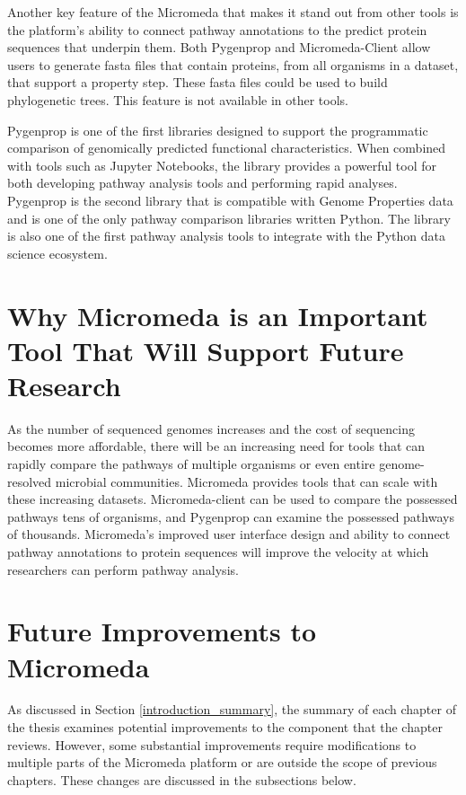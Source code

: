 Another key feature of the Micromeda that makes it stand out from other 
tools is the platform's ability to connect pathway annotations to the predict protein 
sequences that underpin them. Both Pygenprop and Micromeda-Client allow users to 
generate \gls{fasta} files that contain proteins, from all organisms in a dataset, 
that support a property step. These \gls{fasta} files could be used to build 
phylogenetic trees. This feature is not available in other tools.

Pygenprop is one of the first libraries designed to support the programmatic 
comparison of genomically predicted functional characteristics. When combined 
with tools such as Jupyter Notebooks, the library provides a powerful tool for 
both developing pathway analysis tools and performing rapid analyses. Pygenprop 
is the second library that is compatible with Genome Properties data and is one 
of the only pathway comparison libraries written Python. The library is also one 
of the first pathway analysis tools to integrate with the Python data science 
ecosystem.

\section{Why Micromeda is an Important Tool That Will Support Future Research}

As the number of sequenced genomes increases and the cost of sequencing becomes 
more affordable, there will be an increasing need for tools that can rapidly 
compare the pathways of multiple organisms or even entire genome-resolved 
microbial communities. Micromeda provides tools that can scale with these 
increasing datasets. Micromeda-client can be used to compare the possessed 
pathways tens of organisms, and Pygenprop can examine the possessed pathways of 
thousands. Micromeda's improved user interface design and ability to connect 
pathway annotations to protein sequences will improve the velocity at which 
researchers can perform pathway analysis.

\section{Future Improvements to Micromeda}

As discussed in Section \ref{introduction_summary}, the summary of each chapter 
of the thesis examines potential improvements to the component that the chapter 
reviews. However, some substantial improvements require modifications to 
multiple parts of the Micromeda platform or are outside the scope of previous 
chapters. These changes are discussed in the subsections below.

